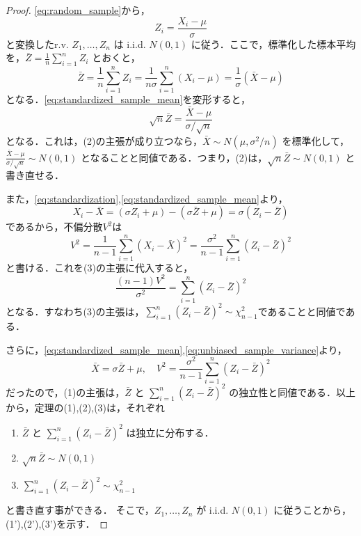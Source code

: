 \documentclass[main.tex]{subfiles}
\begin{document}
\begin{proof}
 
 \eqref{eq:random_sample}から，
  \begin{equation}
    Z_i = \frac{X_i - \mu}{\sigma}
    \label{eq:standardization}
  \end{equation}
  と変換したr.v. $Z_1, \dots, Z_n$ は i.i.d. $N(0,1)$ に従う．ここで，標準化した標本平均を，$\bar{Z}=\frac{1}{n}\sum_{i=1}^{n} Z_i$ とおくと，
  \begin{equation}
    \bar{Z} = \frac{1}{n} \sum_{i=1}^{n} Z_i = \frac{1}{n\sigma} \sum_{i=1}^{n}(X_i - \mu) = \frac{1}{\sigma}(\bar{X}-\mu)
    \label{eq:standardized_sample_mean}
  \end{equation}
  となる．\eqref{eq:standardized_sample_mean}を変形すると，
  \begin{equation}
    \sqrt{n} \bar{Z} = \frac{\bar{X}-\mu}{\sigma/\sqrt{n}}
    \label{eq:standardized_sample_mean2}
  \end{equation}
  となる．これは，(2)の主張が成り立つなら，$\bar{X} \sim N(\mu, \sigma^2/n)$ を標準化して，$\frac{\bar{X}-\mu}{\sigma/\sqrt{n}} \sim N(0,1)$ 
  となることと同値である．つまり，(2)は，$\sqrt{n} \bar{Z} \sim N(0,1)$ と書き直せる．

  また，\eqref{eq:standardization},\quad \eqref{eq:standardized_sample_mean}より，
  \begin{equation}
    X_i - \bar{X} = (\sigma Z_i + \mu) - (\sigma \bar{Z} + \mu) =\sigma(Z_i - \bar{Z})
  \end{equation}
  であるから，不偏分散$V^2$は
  \begin{equation}
    V^2 = \frac{1}{n-1} \sum_{i=1}^{n} (X_i - \bar{X})^2 = \frac{\sigma^2}{n-1} \sum_{i=1}^{n} (Z_i - \bar{Z})^2
    \label{eq:unbiased_sample_variance}
  \end{equation}
  と書ける．これを(3)の主張に代入すると，
  \begin{equation}
    \frac{(n-1)V^2}{\sigma^2} = \sum_{i=1}^{n} (Z_i - \bar{Z})^2
  \end{equation}
  となる．すなわち(3)の主張は，$\sum_{i=1}^{n} (Z_i - \bar{Z})^2 \sim \chi^2_{n-1}$であることと同値である．

  さらに，\eqref{eq:standardized_sample_mean},\quad \eqref{eq:unbiased_sample_variance}より，
  \begin{equation*}
    \bar{X} = \sigma \bar{Z} + \mu, \quad V^2 = \frac{\sigma^2}{n-1} \sum_{i=1}^{n} (Z_i - \bar{Z})^2
  \end{equation*}
  だったので，(1)の主張は，$\bar{Z}$ と $\sum_{i=1}^{n} (Z_i - \bar{Z})^2$ の独立性と同値である．以上から，定理の(1),(2),(3)は，それぞれ
  \begin{bluebox}
  \begin{enumerate}[label=(\arabic*')]
    \item $\bar{Z}$ と $\sum_{i=1}^{n} (Z_i - \bar{Z})^2$ は独立に分布する．
    \item $\sqrt{n}\bar{Z} \sim N(0,1)$
    \item $\sum_{i=1}^{n} (Z_i - \bar{Z})^2 \sim \chi^2_{n-1}$
  \end{enumerate}
\end{bluebox}
  と書き直す事ができる．
  そこで，$Z_1, \dots, Z_n$ が i.i.d. $N(0,1)$ に従うことから，(1'),(2'),(3')を示す．


\end{proof}
\end{document}
